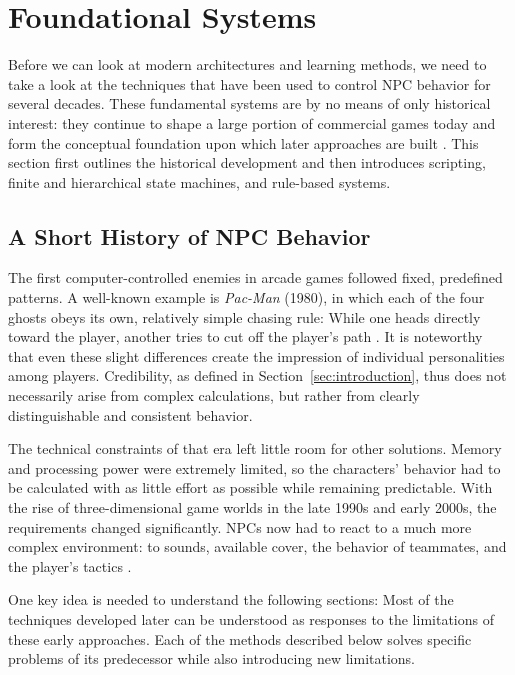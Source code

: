 \section{Foundational Systems}
\label{sec:foundational}

Before we can look at modern architectures and learning methods, we need to take a look at the techniques that have been used to control NPC behavior for several decades. These fundamental systems are by no means of only historical interest: they continue to shape a large portion of commercial games today and form the conceptual foundation upon which later approaches are built \cite{millington2009}. This section first outlines the historical development and then introduces scripting, finite and hierarchical state machines, and rule-based systems.

\subsection{A Short History of NPC Behavior}

The first computer-controlled enemies in arcade games followed fixed, predefined patterns. A well-known example is \emph{Pac-Man} (1980), in which each of the four ghosts obeys its own, relatively simple chasing rule: While one heads directly toward the player, another tries to cut off the player’s path \cite{millington2009}. It is noteworthy that even these slight differences create the impression of individual personalities among players. Credibility, as defined in Section~\ref{sec:introduction}, thus does not necessarily arise from complex calculations, but rather from clearly distinguishable and consistent behavior.

The technical constraints of that era left little room for other solutions. Memory and processing power were extremely limited, so the characters’ behavior had to be calculated with as little effort as possible while remaining predictable. With the rise of three-dimensional game worlds in the late 1990s and early 2000s, the requirements changed significantly. NPCs now had to react to a much more complex environment: to sounds, available cover, the behavior of teammates, and the player’s tactics \cite{laird2001}.

One key idea is needed to understand the following sections: Most of the techniques developed later can be understood as responses to the limitations of these early approaches. Each of the methods described below solves specific problems of its predecessor while also introducing new limitations.

